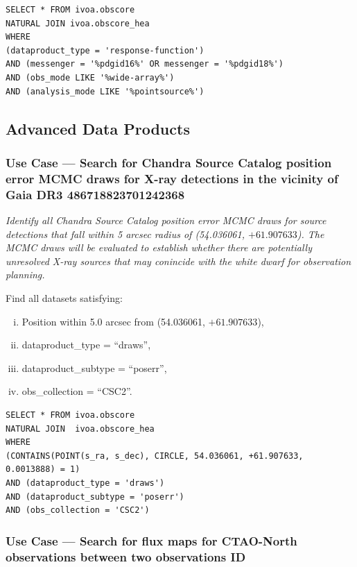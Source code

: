 \begin{verbatim}
SELECT * FROM ivoa.obscore
NATURAL JOIN ivoa.obscore_hea
WHERE
(dataproduct_type = 'response-function')
AND (messenger = '%pdgid16%' OR messenger = '%pdgid18%')
AND (obs_mode LIKE '%wide-array%')
AND (analysis_mode LIKE '%pointsource%')
\end{verbatim}

\subsection{Advanced Data Products}

\subsubsection{Use Case --- Search for Chandra Source Catalog position error MCMC draws for X-ray detections in the vicinity of Gaia DR3 486718823701242368}

{\em Identify all Chandra Source Catalog position error MCMC draws for source detections that fall within 5 arcsec radius of  (54.036061, $+61.907633$).  The MCMC draws will be evaluated to establish whether there are potentially unresolved X-ray sources that may conincide with the white dwarf for observation planning.\/}

\medskip
\noindent Find all datasets satisfying:
\begin{enumerate}[(i)]
  \item Position within 5.0 arcsec from (54.036061, $+61.907633$),
  \item dataproduct\_type = ``draws'',
  \item dataproduct\_subtype = ``poserr'',
  \item obs\_collection = ``CSC2''.
\end{enumerate}

\begin{verbatim}
SELECT * FROM ivoa.obscore
NATURAL JOIN  ivoa.obscore_hea
WHERE
(CONTAINS(POINT(s_ra, s_dec), CIRCLE, 54.036061, +61.907633, 0.0013888) = 1)
AND (dataproduct_type = 'draws')
AND (dataproduct_subtype = 'poserr')
AND (obs_collection = 'CSC2')
\end{verbatim}


\subsubsection{Use Case --- Search for flux maps for CTAO-North observations between two observations ID}

